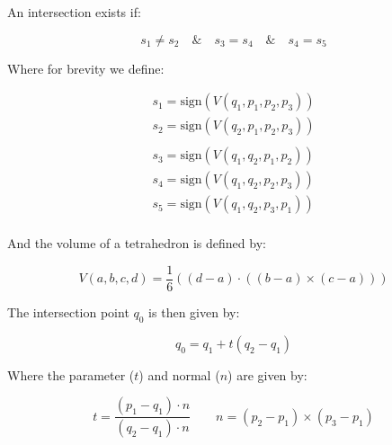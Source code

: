 An intersection exists if:

$$s_1 \neq s_2 \quad \& \quad s_3 = s_4 \quad \& \quad s_4 = s_5 $$

Where for brevity we define:

$$\begin{aligned}
    s_1 = \text{sign}(V(q_1, p_1, p_2, p_3))\\
    s_2 = \text{sign}(V(q_2, p_1, p_2, p_3))\\
    \\
    s_3 = \text{sign}(V(q_1, q_2, p_1, p_2))\\
    s_4 = \text{sign}(V(q_1, q_2, p_2, p_3))\\
    s_5 = \text{sign}(V(q_1, q_2, p_3, p_1))\\
\end{aligned}$$


And the volume of a tetrahedron is defined by:

$$V(a, b, c, d) = \frac{1}{6} \left((d-a) \cdot ((b-a) \times (c-a))\right)$$

The intersection point $q_0$ is then given by:

$$q_0 = q_1 + t (q_2-q_1)$$

Where the parameter ($t$) and normal ($n$) are given by:

$$t = \frac{(p_1-q_1) \cdot n}{(q_2-q_1) \cdot n} \qquad n = (p_2-p_1) \times (p_3-p_1)$$










